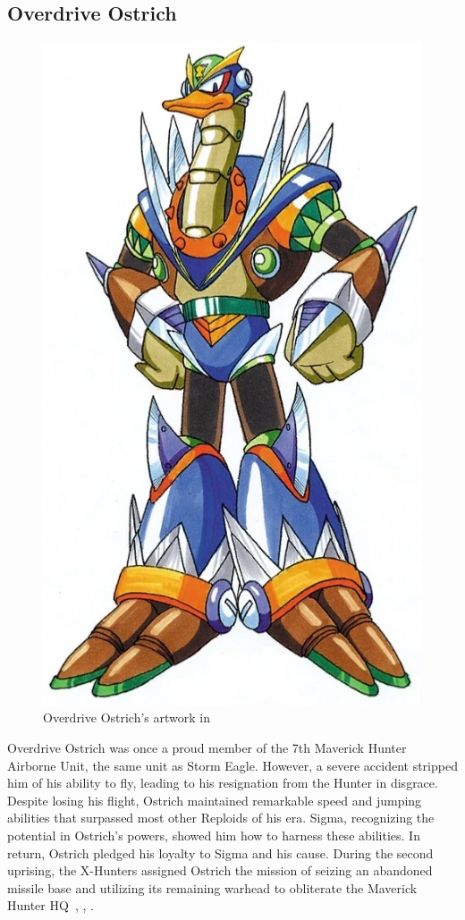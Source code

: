 \subsection{Overdrive Ostrich}\label{boss:Overdrive_ostrich}
\begin{figure}[htp]
	\centering
	\includegraphics[height=\portraitsize]{figures/X2/Overdrive_ostrich/Overdrive_Ostrich.png}
	\caption{Overdrive Ostrich's artwork in \cite{book:MMX_Complete_art}}
\end{figure}
Overdrive Ostrich was once a proud member of the 7th Maverick Hunter Airborne Unit, the same unit as Storm Eagle. However, a severe accident stripped him of his ability to fly, leading to his resignation from the Hunter in disgrace. Despite losing his flight, Ostrich maintained remarkable speed and jumping abilities that surpassed most other Reploids of his era. Sigma, recognizing the potential in Ostrich's powers, showed him how to harness these abilities. In return, Ostrich pledged his loyalty to Sigma and his cause. During the second uprising, the X-Hunters assigned Ostrich the mission of seizing an abandoned missile base and utilizing its remaining warhead to obliterate the Maverick Hunter HQ~\cite{Xcoll1:Manual_X2}, \cite{wayback:X2_resources}, \cite{wiki:Overdrive_Ostrich}.

